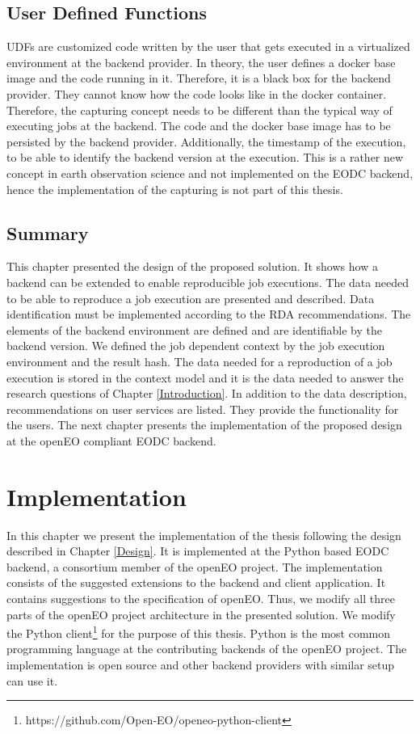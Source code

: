 \documentclass[draft,final]{vutinfth} %
\begin{document}
\section{User Defined Functions}\label{Design:User Defined Functions}
UDFs are customized code written by the user that gets executed in a virtualized environment at the backend provider. In theory, the user defines a docker base image and the code running in it. Therefore, it is a black box for the backend provider. They {cannot} know how the code looks like in the docker container. Therefore, the capturing concept needs to be different than the typical way of executing jobs at the backend. The code and the docker base image has to be persisted by the backend provider. Additionally, the timestamp of the execution, to be able to identify the backend version at the execution. This is a rather new concept in earth observation science and not implemented on the EODC backend, hence the implementation of the capturing is not part of this thesis.

\section{Summary}
This chapter presented the design of the proposed solution. It shows how a backend can be extended to enable reproducible job executions. The data needed to be able to reproduce a job execution are presented and described. Data identification must be implemented according to the RDA recommendations. The elements of the backend environment are defined and are identifiable by the backend version. We defined the job dependent context by the job execution environment and the result hash. The data needed for a reproduction of a job execution is stored in the context model and it is the data needed to answer the research questions of Chapter \ref{Introduction}. In addition to the data description, recommendations on user services are listed. They provide the functionality for the users. The next chapter presents the implementation of the proposed design at the openEO compliant EODC backend.    

\chapter{Implementation}\label{Implementation}

In this chapter we present the {implementation} of the thesis following the design described in Chapter \ref{Design}. It is implemented at the Python based EODC backend, a consortium member of the openEO project. The implementation consists of the suggested extensions to the backend and client application. It contains suggestions to the specification of openEO. Thus, we modify all three parts of the openEO project architecture in the presented solution. We modify the Python client\footnote{https://github.com/Open-EO/openeo-python-client} for the purpose of this thesis.  Python is the most common programming language at the contributing backends of the openEO project. The implementation is open source and other backend providers with similar setup can use it.  
\end{document}
